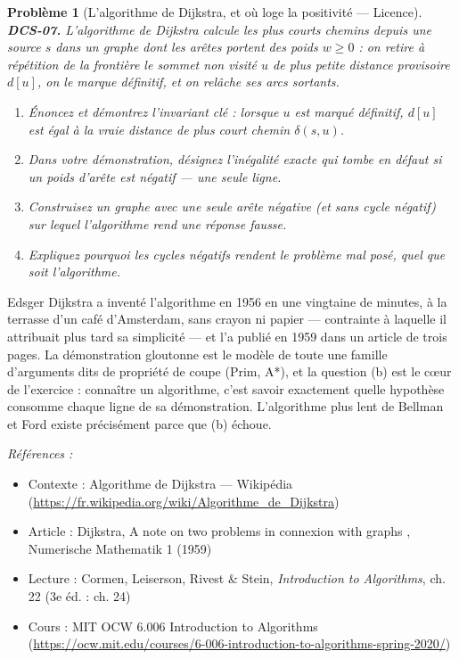 \documentclass[11pt]{article}
\newtheorem{problem}{Problème}
\newenvironment{refs}{\par\small\noindent\emph{Références :}\begin{itemize}\setlength\itemsep{0pt}}{\end{itemize}\normalsize}
\begin{document}
\bigskip

\begin{problem}[{L'algorithme de Dijkstra, et où loge la positivité --- Licence}]
\textbf{DCS-07.} L'algorithme de Dijkstra calcule les plus courts chemins depuis une source $s$ dans un graphe dont les arêtes portent des poids $w \ge 0$ : on retire à répétition de la frontière le sommet non visité $u$ de plus petite distance provisoire $d[u]$, on le marque définitif, et on relâche ses arcs sortants.
\begin{enumerate}
\item[(a)] Énoncez et démontrez l'invariant clé : lorsque $u$ est marqué définitif, $d[u]$ est égal à la vraie distance de plus court chemin $\delta(s, u)$.
\item[(b)] Dans votre démonstration, désignez l'inégalité \textit{exacte} qui tombe en défaut si un poids d'arête est négatif --- une seule ligne.
\item[(c)] Construisez un graphe avec une seule arête négative (et sans cycle négatif) sur lequel l'algorithme rend une réponse fausse.
\item[(d)] Expliquez pourquoi les cycles négatifs rendent le problème mal posé, quel que soit l'algorithme.
\end{enumerate}

\end{problem}

\noindent Edsger Dijkstra a inventé l'algorithme en 1956 en une vingtaine de minutes, à la terrasse d'un café d'Amsterdam, sans crayon ni papier --- contrainte à laquelle il attribuait plus tard sa simplicité --- et l'a publié en 1959 dans un article de trois pages. La démonstration gloutonne est le modèle de toute une famille d'arguments dits \og{} de propriété de coupe \fg{} (Prim, A*), et la question (b) est le c\oe{}ur de l'exercice : connaître un algorithme, c'est savoir exactement quelle hypothèse consomme chaque ligne de sa démonstration. L'algorithme plus lent de Bellman et Ford existe précisément parce que (b) échoue.

\begin{refs}
\item Contexte : Algorithme de Dijkstra --- Wikipédia (\url{https://fr.wikipedia.org/wiki/Algorithme_de_Dijkstra})
\item Article : Dijkstra, \og{} A note on two problems in connexion with graphs \fg{}, Numerische Mathematik 1 (1959)
\item Lecture : Cormen, Leiserson, Rivest \& Stein, \textit{Introduction to Algorithms}, ch. 22 (3e éd. : ch. 24)
\item Cours : MIT OCW 6.006 Introduction to Algorithms (\url{https://ocw.mit.edu/courses/6-006-introduction-to-algorithms-spring-2020/})
\end{refs}
\end{document}
